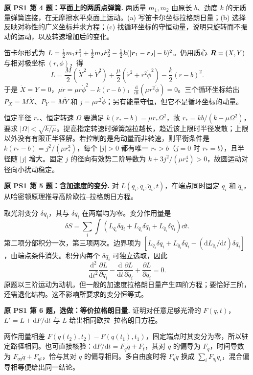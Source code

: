 \begin{example}
\textbf{原 PS1 第 4 题：平面上的两质点弹簧.} 
两质量 $m_1,m_2$ 由原长 $b$、劲度 $k$ 的无质量弹簧连接，在无摩擦水平桌面上运动。(a) 写笛卡尔坐标拉格朗日量；(b) 选择反映对称性的广义坐标并求方程；(c) 找循环坐标的守恒动量，说明只旋转而不振动的运动，以及转速增加后的变化。
\end{example}
\begin{solution}
笛卡尔形式为 $L=\frac12m_1\dot{\boldsymbol{r}}_1^2+\frac12m_2\dot{\boldsymbol{r}}_2^2-\frac12k(|\boldsymbol{r}_1-\boldsymbol{r}_2|-b)^2$。仍用质心 $\boldsymbol{R}=(X,Y)$ 与相对极坐标 $(r,\phi)$，得
\[
 L=\frac M2(\dot X^2+\dot Y^2)+\frac\mu2(\dot r^2+r^2\dot\phi^2)-\frac k2(r-b)^2.
\]
于是 $\ddot X=\ddot Y=0$，$\mu\ddot r=\mu r\dot\phi^2-k(r-b)$，$\frac{\mathrm d}{\mathrm dt}(\mu r^2\dot\phi)=0$。三个循环坐标给出 $P_X=M\dot X$、$P_Y=M\dot Y$ 和 $j=\mu r^2\dot\phi$；另有能量守恒，但它不是循环坐标的动量。

恒定半径 $r_*$、恒定转速 $\Omega$ 要满足 $k(r_*-b)=\mu r_*\Omega^2$，故 $r_*=kb/(k-\mu\Omega^2)$，要求 $|\Omega|<\sqrt{k/\mu}$。提高指定转速时弹簧越拉越长，趋近该上限时半径发散；上限以外没有有限正半径解。若控制的是角动量而非转速，则平衡条件是 $k(r_*-b)=j^2/(\mu r_*^3)$，每个 $|j|>0$ 都有唯一 $r_*>b$（$j=0$ 时 $r_*=b$），且半径随 $|j|$ 增大。固定 $j$ 的径向有效势二阶导数为 $k+3j^2/(\mu r_*^4)>0$，故圆运动对径向小扰动稳定。
\end{solution}

\begin{example}
\textbf{原 PS1 第 5 题：含加速度的变分.} 
对 $L(q_i,\dot q_i,\ddot q_i,t)$，在端点同时固定 $q_i$ 和 $\dot q_i$，从哈密顿原理推导高阶欧拉--拉格朗日方程。
\end{example}
\begin{solution}
取光滑变分 $\delta q_i$，其与 $\delta\dot q_i$ 在两端均为零。变分作用量是
\[
 \delta S=\sum_i\int\left(L_{q_i}\delta q_i+L_{\dot q_i}\delta\dot q_i+L_{\ddot q_i}\delta\ddot q_i\right)\dd t.
\]
第二项分部积分一次，第三项两次。边界项为 $[L_{\dot q_i}\delta q_i+L_{\ddot q_i}\delta\dot q_i-(\mathrm dL_{\ddot q_i}/\mathrm dt)\delta q_i]$，由端点条件消失。积分内每个 $\delta q_i$ 可独立选取，因此
\[
 \frac{\mathrm d^2}{\mathrm dt^2}\frac{\partial L}{\partial\ddot q_i}
 -\frac{\mathrm d}{\mathrm dt}\frac{\partial L}{\partial\dot q_i}
 +\frac{\partial L}{\partial q_i}=0.
\]
原题以三阶运动为动机，但一般的加速度拉格朗日量产生四阶方程；要恰好三阶，还需退化结构。这不影响所要求的变分恒等式。
\end{solution}

\begin{example}
\textbf{原 PS1 第 6 题，选做：等价拉格朗日量.} 
证明对任意足够光滑的 $F(q,t)$，$L'=L+\mathrm dF/\mathrm dt$ 与 $L$ 给出相同欧拉--拉格朗日方程。
\end{example}
\begin{solution}
两作用量相差 $F(q(t_2),t_2)-F(q(t_1),t_1)$，固定端点时其变分为零，所以驻定路径相同。也可直接核验：$\mathrm dF/\mathrm dt=F_q\dot q+F_t$，其对 $\dot q$ 的偏导为 $F_q$，时间导数为 $F_{qq}\dot q+F_{qt}$，恰与其对 $q$ 的偏导相同。多自由度时将 $F_q\dot q$ 换成 $\sum_i F_{q_i}\dot q_i$，混合偏导相等便给出同一结论。
\end{solution}

